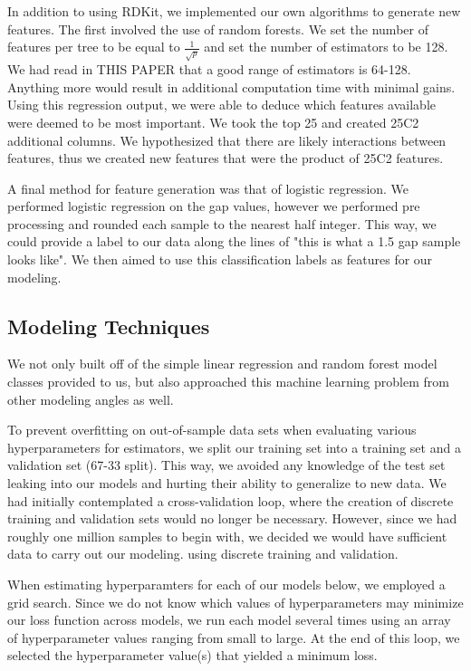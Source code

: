 \documentclass[11pt, oneside]{article}   	%
\begin{document}
In addition to using RDKit, we implemented our own algorithms to generate new features. The first involved the use of random forests. We set the number of features per tree to be equal to $\frac{1}{\sqrt{p}}$ and set the number of estimators to be 128. We had read in THIS PAPER that a good range of estimators is 64-128. Anything more would result in additional computation time with minimal gains. Using this regression output, we were able to deduce which features available were deemed to be most important. We took the top 25 and created 25C2 additional columns. We hypothesized that there are likely interactions between features, thus we created new features that were the product of 25C2 features. 

A final method for feature generation was that of logistic regression. We performed logistic regression on the gap values, however we performed pre processing and rounded each sample to the nearest half integer. This way, we could provide a label to our data along the lines of "this is what a 1.5 gap sample looks like". We then aimed to use this classification labels as features for our modeling.

\subsection{Modeling Techniques} 

We not only built off of the simple linear regression and random forest model classes provided to us, but also approached this machine learning problem from other modeling angles as well. 

To prevent overfitting on out-of-sample data sets when evaluating various hyperparameters for estimators, we split our training set into a training set and a validation set (67-33 split). This way, we avoided any knowledge of the test set leaking into our models and hurting their ability to generalize to new data. We had initially contemplated a cross-validation loop, where the creation of discrete training and validation sets would no longer be necessary. However, since we had roughly one million samples to begin with, we decided we would have sufficient data to carry out our modeling. using discrete training and validation.

When estimating hyperparamters for each of our models below, we employed a grid search. Since we do not know which values of hyperparameters may minimize our loss function across models, we run each model several times using an array of hyperparameter values ranging from small to large. At the end of this loop, we selected the hyperparameter value(s) that yielded a minimum loss. 
\end{document}
